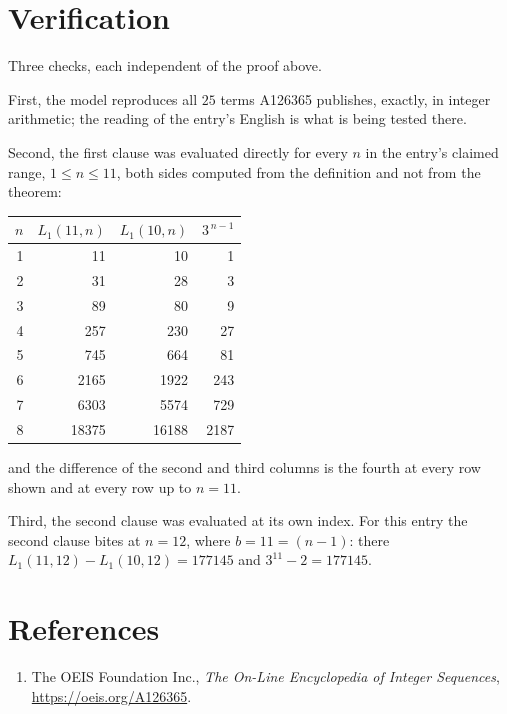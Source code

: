 \documentclass[11pt,a4paper]{article}
\theoremstyle{plain}
\theoremstyle{definition}
\begin{document}
\section{Verification}

Three checks, each independent of the proof above.

First, the model reproduces all $25$ terms A126365 publishes, exactly, in integer
arithmetic; the reading of the entry's English is what is being tested there.

Second, the first clause was evaluated directly for every $n$ in the entry's claimed range,
$1\le n\le11$, both sides computed from the definition and not from the theorem:

\begin{center}
\begin{tabular}{rrrr}
$n$ & $L_{1}(11,n)$ & $L_{1}(10,n)$ & $3^{\,n-1}$ \\ \hline
1 & 11 & 10 & 1 \\
2 & 31 & 28 & 3 \\
3 & 89 & 80 & 9 \\
4 & 257 & 230 & 27 \\
5 & 745 & 664 & 81 \\
6 & 2165 & 1922 & 243 \\
7 & 6303 & 5574 & 729 \\
8 & 18375 & 16188 & 2187 \\
\end{tabular}
\end{center}

\noindent and the difference of the second and third columns is the fourth at every row shown
and at every row up to $n=11$.

Third, the second clause was evaluated at its own index. For this entry the second clause bites at $n=12$, where $b=11=(n-1)$: there $L_{1}(11,12)-L_{1}(10,12)=177145$ and $3^{11}-2=177145$.

\section*{References}
\begin{enumerate}
\item The OEIS Foundation Inc., \emph{The On-Line Encyclopedia of Integer Sequences},
\url{https://oeis.org/A126365}.
\end{enumerate}
\end{document}
